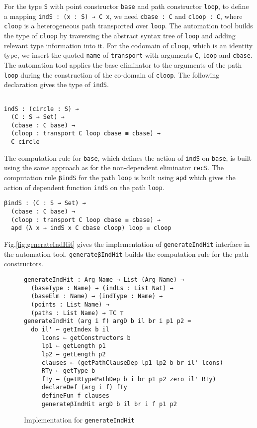 \documentclass[sigplan,10pt]{acmart}
\begin{document}
For the type {\tt S} with point constructor {\tt base} and path constructor {\tt loop}, to define a mapping {\tt indS : (x : S) → C x}, we need {\tt cbase : C} and {\tt cloop : C}, where {\tt cloop} is a heterogeneous path transported over {\tt loop}. The automation tool builds the type of {\tt cloop} by traversing the abstract syntax tree of {\tt loop} and adding relevant type information into it. For the codomain of {\tt cloop}, which is an identity type, we insert the quoted {\tt name} of {\tt transport} with arguments {\tt C}, {\tt loop} and {\tt cbase}. The automation tool applies the base eliminator to the arguments of the path {\tt loop} during the construction of the co-domain of {\tt cloop}. The following declaration gives the type of {\tt indS}.
\begin{center}
\begin{BVerbatim}

indS : (circle : S) → 
  (C : S → Set) →
  (cbase : C base) →
  (cloop : transport C loop cbase ≡ cbase) →
  C circle
\end{BVerbatim}
\end{center}

The computation rule for {\tt base}, which defines the action of {\tt indS} on {\tt base}, is built using the same approach as for the non-dependent eliminator {\tt recS}. The computation rule {\tt βindS} for the path {\tt loop} is built using {\tt apd} which gives the action of dependent function {\tt indS} on the path {\tt loop}.
\begin{center}
\begin{BVerbatim}
βindS : (C : S → Set) → 
  (cbase : C base) → 
  (cloop : transport C loop cbase ≡ cbase) → 
  apd (λ x → indS x C cbase cloop) loop ≡ cloop

\end{BVerbatim}
\end{center}

Fig.\eqref{fig:generateIndHit} gives the implementation of {\tt generateIndHit} interface in the automation tool. {\tt generateβIndHit} builds the computation rule for the path constructors.

\begin{figure}
\begin{center}
\fontsize{7pt}{9pt}\selectfont
\begin{Verbatim}
generateIndHit : Arg Name → List (Arg Name) →
  (baseType : Name) → (indLs : List Nat) →
  (baseElm : Name) → (indType : Name) →
  (points : List Name) → 
  (paths : List Name) → TC ⊤
generateIndHit (arg i f) argD b il br i p1 p2 =
  do il' ← getIndex b il
     lcons ← getConstructors b
     lp1 ← getLength p1
     lp2 ← getLength p2
     clauses ← (getPathClauseDep lp1 lp2 b br il' lcons)
     RTy ← getType b
     fTy ← (getRtypePathDep b i br p1 p2 zero il' RTy)
     declareDef (arg i f) fTy
     defineFun f clauses
     generateβIndHit argD b il br i f p1 p2
\end{Verbatim}
\end{center}
\caption{Implementation for {\tt generateIndHit}}
\label{fig:generateIndHit}
\end{figure}
\normalsize
\end{document}
